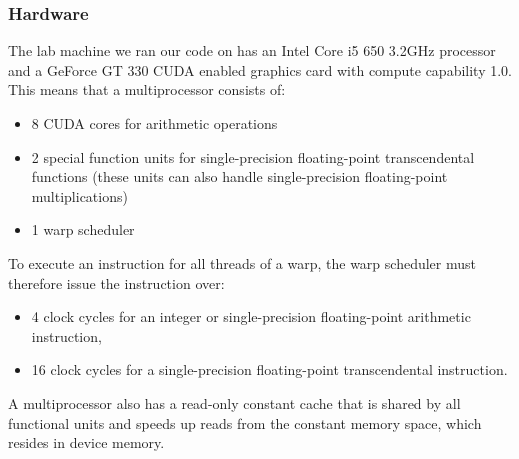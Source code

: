 \subsubsection{Hardware}
  The lab machine we ran our code on has an Intel Core i5 650 3.2GHz processor and a GeForce GT 330 CUDA enabled graphics card with compute capability 1.0. This means that a multiprocessor consists of\cite{compute_1.0}:
  \begin{itemize}
    \item 8 CUDA cores for arithmetic operations
    \item 2 special function units for single-precision floating-point transcendental functions (these units can also handle single-precision floating-point multiplications)
    \item 1 warp scheduler
  \end{itemize}
  To execute an instruction for all threads of a warp, the warp scheduler must therefore issue the instruction over:
  \begin{itemize}
    \item 4 clock cycles for an integer or single-precision floating-point arithmetic instruction,
    \item 16 clock cycles for a single-precision floating-point transcendental instruction.
  \end{itemize}
  A multiprocessor also has a read-only constant cache that is shared by all functional units and speeds up reads from the constant memory space, which resides in device memory.